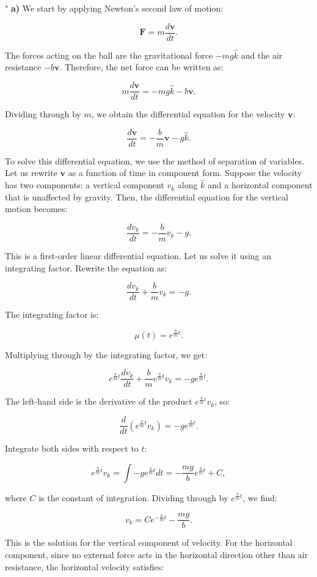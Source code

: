 "
\textbf{a)} We start by applying Newton's second law of motion:

\[
\mathbf{F} = m \frac{d\mathbf{v}}{dt}.
\]

The forces acting on the ball are the gravitational force $-mg\hat{k}$ and the air resistance $-b\mathbf{v}$. Therefore, the net force can be written as:

\[
m \frac{d\mathbf{v}}{dt} = -mg\hat{k} - b\mathbf{v}.
\]

Dividing through by $m$, we obtain the differential equation for the velocity $\mathbf{v}$:

\[
\frac{d\mathbf{v}}{dt} = -\frac{b}{m} \mathbf{v} - g\hat{k}.
\]

To solve this differential equation, we use the method of separation of variables. Let us rewrite $\mathbf{v}$ as a function of time in component form. Suppose the velocity has two components: a vertical component $v_k$ along $\hat{k}$ and a horizontal component that is unaffected by gravity. Then, the differential equation for the vertical motion becomes:

\[
\frac{d v_k}{dt} = -\frac{b}{m} v_k - g.
\]

This is a first-order linear differential equation. Let us solve it using an integrating factor. Rewrite the equation as:

\[
\frac{d v_k}{dt} + \frac{b}{m} v_k = -g.
\]

The integrating factor is:

\[
\mu(t) = e^{\frac{b}{m}t}.
\]

Multiplying through by the integrating factor, we get:

\[
e^{\frac{b}{m}t} \frac{d v_k}{dt} + \frac{b}{m} e^{\frac{b}{m}t} v_k = -g e^{\frac{b}{m}t}.
\]

The left-hand side is the derivative of the product $e^{\frac{b}{m}t} v_k$, so:

\[
\frac{d}{dt} \left( e^{\frac{b}{m}t} v_k \right) = -g e^{\frac{b}{m}t}.
\]

Integrate both sides with respect to $t$:

\[
e^{\frac{b}{m}t} v_k = \int -g e^{\frac{b}{m}t} dt = -\frac{mg}{b} e^{\frac{b}{m}t} + C,
\]

where $C$ is the constant of integration. Dividing through by $e^{\frac{b}{m}t}$, we find:

\[
v_k = C e^{-\frac{b}{m}t} - \frac{mg}{b}.
\]

This is the solution for the vertical component of velocity. For the horizontal component, since no external force acts in the horizontal direction other than air resistance, the horizontal velocity satisfies:

